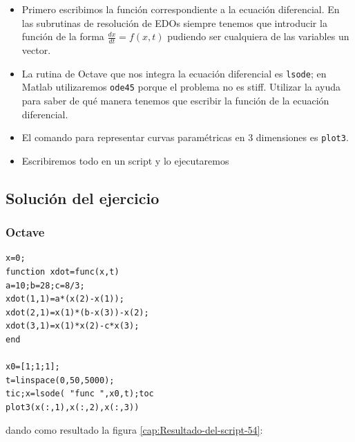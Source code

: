  \begin{itemize}
 \item Primero escribimos la función correspondiente a la ecuación
   diferencial.  En las subrutinas de resolución de EDOs siempre
   tenemos que introducir la función de la forma
   $\frac{dx}{dt}=f(x,t)$ pudiendo ser cualquiera de las variables un
   vector.
 \item La rutina de Octave que nos integra la ecuación diferencial es
   \texttt{lsode}; en Matlab utilizaremos \texttt{ode45} porque el
   problema no es stiff.  Utilizar la ayuda para saber de qué manera
   tenemos que escribir la función de la ecuación diferencial.
 \item El comando para representar curvas paramétricas en 3
   dimensiones es \texttt{plot3}.
 \item Escribiremos todo en un script y lo ejecutaremos
 \end{itemize}

\subsection{Solución del ejercicio}


\subsubsection{Octave}

\begin{verbatim}
x=0;
function xdot=func(x,t)
a=10;b=28;c=8/3;
xdot(1,1)=a*(x(2)-x(1));
xdot(2,1)=x(1)*(b-x(3))-x(2);
xdot(3,1)=x(1)*x(2)-c*x(3);
end

x0=[1;1;1];
t=linspace(0,50,5000);
tic;x=lsode( "func ",x0,t);toc
plot3(x(:,1),x(:,2),x(:,3))
\end{verbatim}
dando como resultado la figura \ref{cap:Resultado-del-script-54}:

